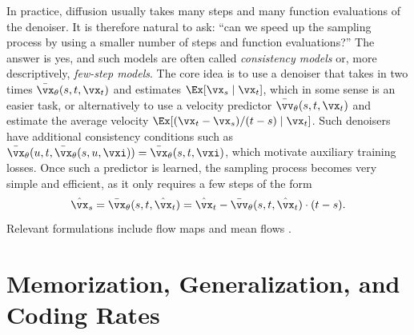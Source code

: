 \documentclass[../../book-main.tex]{subfiles}
\begin{document}
\begin{remark}
    In practice, diffusion usually takes many steps and many function
    evaluations of the denoiser. It is therefore natural to ask:
    ``can we speed up the sampling process by using a smaller number
    of steps and function evaluations?'' The answer is yes, and such
    models are often called \textit{consistency models} or, more
    descriptively, \textit{few-step models}. The core idea is to use a
    denoiser that takes in two times \(\bar{\vx}_{\theta}(s, t,
    \vx_{t})\) and estimates \(\Ex[\vx_{s} \mid \vx_{t}]\), which in
    some sense is
    an easier task, or alternatively to use a velocity predictor
    \(\bar{\vv}_{\theta}(s, t, \vx_{t})\) and estimate the average
    velocity \(\Ex[(\vx_{t} - \vx_{s})/(t - s) \mid \vx_{t}]\). Such
    denoisers have additional consistency
    conditions such as \(\bar{\vx}_{\theta}(u, t,
    \bar{\vx}_{\theta}(s, u, \vxi)) = \bar{\vx}_{\theta}(s, t, \vxi)\),
    which motivate auxiliary training losses. Once such a predictor
    is learned, the
    sampling process becomes very simple and efficient, as it only
    requires a few steps of the form
    \begin{equation}
        \hat{\vx}_{s} = \bar{\vx}_{\theta}(s, t, \hat{\vx}_{t}) =
        \hat{\vx}_{t} - \bar{\vv}_{\theta}(s, t, \hat{\vx}_{t})\cdot(t - s).
    \end{equation}
    Relevant formulations include flow maps \cite{boffi2025build} and
    mean flows \cite{geng2025mean}.
\end{remark}

\section{Memorization, Generalization, and Coding Rates}
\label{sec:diffusion_memorization}
\end{document}

